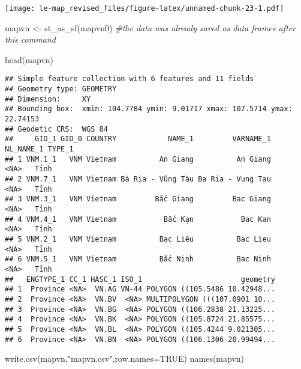 \documentclass[
]{article}
\newenvironment{Shaded}{\begin{snugshade}}{\end{snugshade}}
\newcommand{\AttributeTok}[1]{\textcolor[rgb]{0.77,0.63,0.00}{#1}}
\newcommand{\CommentTok}[1]{\textcolor[rgb]{0.56,0.35,0.01}{\textit{#1}}}
\newcommand{\ConstantTok}[1]{\textcolor[rgb]{0.00,0.00,0.00}{#1}}
\newcommand{\FunctionTok}[1]{\textcolor[rgb]{0.00,0.00,0.00}{#1}}
\newcommand{\NormalTok}[1]{#1}
\newcommand{\OtherTok}[1]{\textcolor[rgb]{0.56,0.35,0.01}{#1}}
\newcommand{\StringTok}[1]{\textcolor[rgb]{0.31,0.60,0.02}{#1}}
\begin{document}
\texttt{[image: le-map\_revised\_files/figure-latex/unnamed-chunk-23-1.pdf]}

\begin{Shaded}
\begin{Highlighting}[]
\NormalTok{mapvn }\OtherTok{\textless{}{-}} \FunctionTok{st\_as\_sf}\NormalTok{(mapvn0) }\CommentTok{\#the data was already saved as data frames after this command}
\end{Highlighting}
\end{Shaded}

\begin{Shaded}
\begin{Highlighting}[]
\FunctionTok{head}\NormalTok{(mapvn)}
\end{Highlighting}
\end{Shaded}

\begin{verbatim}
## Simple feature collection with 6 features and 11 fields
## Geometry type: GEOMETRY
## Dimension:     XY
## Bounding box:  xmin: 104.7784 ymin: 9.01717 xmax: 107.5714 ymax: 22.74153
## Geodetic CRS:  WGS 84
##     GID_1 GID_0 COUNTRY            NAME_1         VARNAME_1 NL_NAME_1 TYPE_1
## 1 VNM.1_1   VNM Vietnam          An Giang          An Giang      <NA>   Tỉnh
## 2 VNM.7_1   VNM Vietnam Bà Rịa - Vũng Tàu Ba Ria - Vung Tau      <NA>   Tỉnh
## 3 VNM.3_1   VNM Vietnam         Bắc Giang         Bac Giang      <NA>   Tỉnh
## 4 VNM.4_1   VNM Vietnam           Bắc Kạn           Bac Kan      <NA>   Tỉnh
## 5 VNM.2_1   VNM Vietnam          Bạc Liêu          Bac Lieu      <NA>   Tỉnh
## 6 VNM.5_1   VNM Vietnam          Bắc Ninh          Bac Ninh      <NA>   Tỉnh
##   ENGTYPE_1 CC_1 HASC_1 ISO_1                       geometry
## 1  Province <NA>  VN.AG VN-44 POLYGON ((105.5486 10.42948...
## 2  Province <NA>  VN.BV  <NA> MULTIPOLYGON (((107.0901 10...
## 3  Province <NA>  VN.BG  <NA> POLYGON ((106.2838 21.13225...
## 4  Province <NA>  VN.BK  <NA> POLYGON ((105.8724 21.85575...
## 5  Province <NA>  VN.BL  <NA> POLYGON ((105.4244 9.021305...
## 6  Province <NA>  VN.BN  <NA> POLYGON ((106.1306 20.99494...
\end{verbatim}

\begin{Shaded}
\begin{Highlighting}[]
\FunctionTok{write.csv}\NormalTok{(mapvn,}\StringTok{"mapvn.csv"}\NormalTok{,}\AttributeTok{row.names=}\ConstantTok{TRUE}\NormalTok{)}
\FunctionTok{names}\NormalTok{(mapvn)}
\end{Highlighting}
\end{Shaded}
\end{document}
